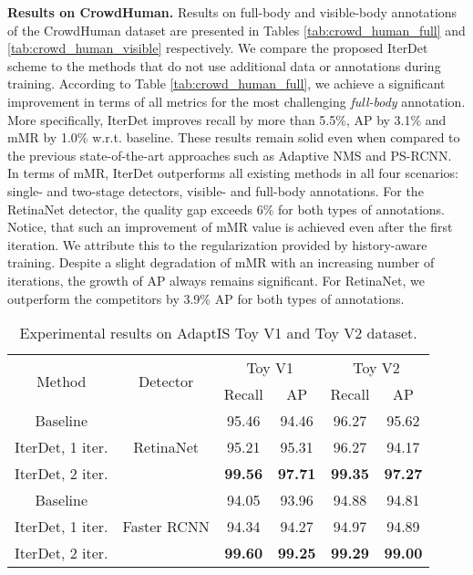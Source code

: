 \documentclass[runningheads]{llncs}
\begin{document}
\textbf{Results on CrowdHuman.} Results on full-body and visible-body annotations of the CrowdHuman dataset are presented in Tables \ref{tab:crowd_human_full} and \ref{tab:crowd_human_visible} respectively. We compare the proposed IterDet scheme to the methods that do not use additional data or annotations during training. According to Table \ref{tab:crowd_human_full}, we achieve a significant improvement in terms of all metrics for the most challenging \emph{full-body} annotation. More specifically, IterDet improves recall by more than 5.5\%, AP by 3.1\% and mMR by 1.0\% w.r.t. baseline. These results remain solid even when compared to the previous state-of-the-art approaches such as Adaptive NMS and PS-RCNN. In terms of mMR, IterDet outperforms all existing methods in all four scenarios: single- and two-stage detectors, visible- and full-body annotations. For the RetinaNet detector, the quality gap exceeds 6\% for both types of annotations. Notice, that such an improvement of mMR value is achieved even after the first iteration. We attribute this to the regularization provided by history-aware training. Despite a slight degradation of mMR with an increasing number of iterations, the growth of AP always remains significant. For RetinaNet, we outperform the competitors by 3.9\% AP for both types of annotations.

\begin{table*}[h!]
    \centering
    \begin{tabular}{c|c|cc|cc}
        \hline
        \multirow[b]{2}{*}{Method} & \multirow[b]{2}{*}{Detector} & \multicolumn{2}{c|}{Toy V1} & \multicolumn{2}{c}{Toy V2} \\ \cline{3-6}
        && Recall & AP & Recall & AP \\ \hline \hline
        Baseline & \multirow{3}{*}{RetinaNet} & 95.46 & 94.46 & 96.27 &	95.62 \\ \cline{1-1} \cline{3-6}
        IterDet, 1 iter. && 95.21 & 95.31 & 96.27 & 94.17 \\
        IterDet, 2 iter. && \textbf{99.56} & \textbf{97.71} & \textbf{99.35} & \textbf{97.27} \\ \hline \hline
        Baseline & \multirow{3}{*}{Faster RCNN} & 94.05 & 93.96 & 94.88 & 94.81 \\ \cline{1-1} \cline{3-6}
        IterDet, 1 iter. && 94.34 & 94.27 & 94.97 & 94.89 \\
        IterDet, 2 iter. && \textbf{99.60} & \textbf{99.25} & \textbf{99.29} & \textbf{99.00} \\ \hline
    \end{tabular}
    \caption{Experimental results on AdaptIS Toy V1 and Toy V2 dataset.}
    \label{tab:toy}
\end{table*}
\end{document}

